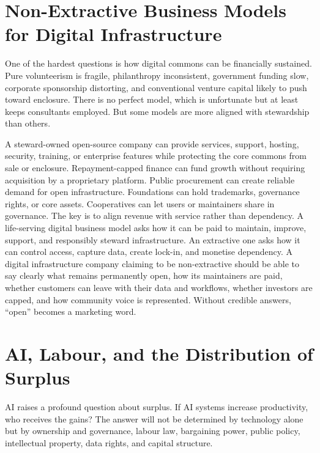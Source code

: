 \documentclass[11pt,a4paper,oneside]{book}
\begin{document}
\section*{Non-Extractive Business Models for Digital Infrastructure}

One of the hardest questions is how digital commons can be financially sustained. Pure volunteerism is fragile, philanthropy inconsistent, government funding slow, corporate sponsorship distorting, and conventional venture capital likely to push toward enclosure. There is no perfect model, which is unfortunate but at least keeps consultants employed. But some models are more aligned with stewardship than others.

A steward-owned open-source company can provide services, support, hosting, security, training, or enterprise features while protecting the core commons from sale or enclosure. Repayment-capped finance can fund growth without requiring acquisition by a proprietary platform. Public procurement can create reliable demand for open infrastructure. Foundations can hold trademarks, governance rights, or core assets. Cooperatives can let users or maintainers share in governance. The key is to align revenue with service rather than dependency. A life-serving digital business model asks how it can be paid to maintain, improve, support, and responsibly steward infrastructure. An extractive one asks how it can control access, capture data, create lock-in, and monetise dependency. A digital infrastructure company claiming to be non-extractive should be able to say clearly what remains permanently open, how its maintainers are paid, whether customers can leave with their data and workflows, whether investors are capped, and how community voice is represented. Without credible answers, ``open'' becomes a marketing word.

\section*{AI, Labour, and the Distribution of Surplus}

AI raises a profound question about surplus. If AI systems increase productivity, who receives the gains? The answer will not be determined by technology alone but by ownership and governance, labour law, bargaining power, public policy, intellectual property, data rights, and capital structure.
\end{document}
